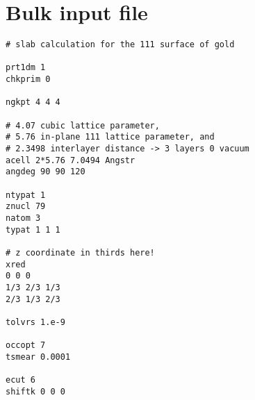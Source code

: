 \documentclass{report}
\begin{document}
\section{Bulk input file}
\begin{verbatim}
# slab calculation for the 111 surface of gold

prt1dm 1
chkprim 0

ngkpt 4 4 4

# 4.07 cubic lattice parameter, 
# 5.76 in-plane 111 lattice parameter, and 
# 2.3498 interlayer distance -> 3 layers 0 vacuum
acell 2*5.76 7.0494 Angstr
angdeg 90 90 120

ntypat 1
znucl 79
natom 3
typat 1 1 1

# z coordinate in thirds here!
xred 
0 0 0
1/3 2/3 1/3
2/3 1/3 2/3

tolvrs 1.e-9

occopt 7
tsmear 0.0001

ecut 6
shiftk 0 0 0
\end{verbatim}
\end{document}

